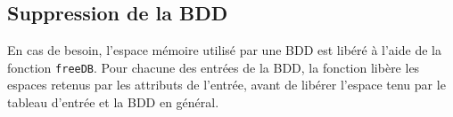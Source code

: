 \subsection{Suppression de la BDD}

En cas de besoin, l'espace mémoire utilisé par une BDD est libéré à l'aide de la fonction \verb|freeDB|. Pour chacune des entrées de la BDD, la fonction libère les espaces retenus par les attributs de l'entrée, avant de libérer l'espace tenu par le tableau d'entrée et la BDD en général.


